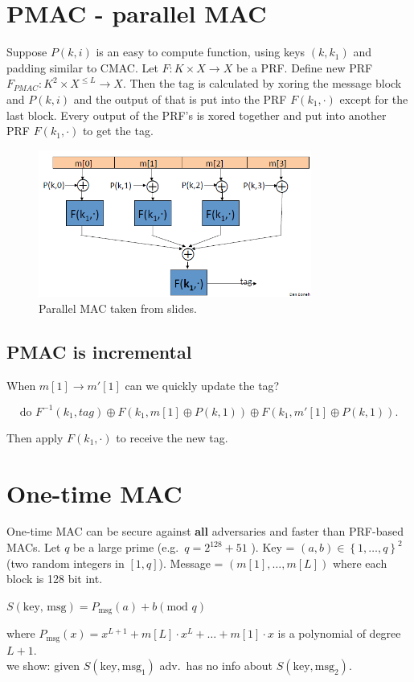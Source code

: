 \documentclass[a4paper]{article}
\newcommand{\incfig}[1]{%
	\def\svgwidth{\columnwidth}
	{#1.pdf_tex}
}
\begin{document}
	\section{PMAC - parallel MAC}
	Suppose $P\left( k,i \right) $ is an easy to compute function, using keys $\left( k,k_1 \right) $
	and padding similar to CMAC. Let $F:K\times X \to X$ be a PRF. Define new PRF $F_{PMAC}:K^2\times X^{\le L}\to X$.
	Then the tag is calculated by xoring the message block and $P\left( k,i \right) $ and the output
	of that is put into the PRF $F\left( k_1,\cdot  \right) $ except for the last block.
	Every output of the PRF's is xored together and put into another PRF
	$F\left( k_1,\cdot  \right) $ to get the tag.
	\begin{figure}[ht]
		\centering
		\includegraphics[width=0.8\textwidth]{pmac_slide}
		\caption{Parallel MAC taken from slides.}
		\label{fig:pmac}
	\end{figure}
	\subsection{PMAC is incremental}
	When $m\left[ 1 \right] \to m'\left[ 1 \right] $ can we quickly update the tag?
	\begin{center}
		\[
			\text{do } F^{-1}\left( k_1,tag \right) \oplus F\left( k_1,m\left[ 1 \right] \oplus P\left( k,1 \right)  \right) 
			\oplus F\left( k_1,m'\left[ 1 \right] \oplus P\left( k,1 \right)  \right)
		.\] 
	\end{center}
	Then apply $F\left( k_1,\cdot  \right) $ to receive the new tag.
	\section{One-time MAC}
	One-time MAC can be secure against \textbf{all} adversaries and faster than PRF-based MACs.
	Let $q$ be a large prime (e.g.\ $q = 2^{128}+51$ ). Key =
	$\left( a,b \right) \in \left\{ 1,\ldots,q \right\}^{2}$ (two random integers in $\left[ 1,q \right] $).
	Message = $\left( m\left[ 1 \right] ,\ldots, m\left[ L \right]  \right) $ where each block is 128 bit int.
	\begin{center}
		$S\left( \text{key, msg} \right) = P_{\text{msg}}\left( a \right) + b \left( \text{mod }q \right) $
	\end{center}
	where $P_{\text{msg}}\left( x \right)  = x^{L+1} + m\left[ L \right] \cdot x^L + \ldots + m\left[ 1 \right] \cdot x$ is a polynomial of degree $L+1$.\\
	we show: given $S\left( \text{key},\text{msg}_1 \right) $ adv.\ has no info about $S\left( \text{key},\text{msg}_2 \right) $.\\
\end{document}
